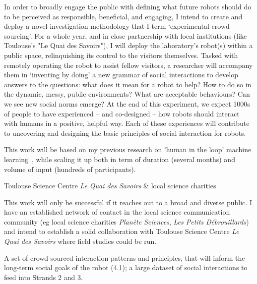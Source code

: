 In order to broadly engage the public with defining what future robots should do
to be perceived as responsible, beneficial, and engaging, I intend to create and
deploy a novel investigation methodology that I term `experimental
crowd-sourcing'. 
For a whole year, and in close partnership with local institutions
(like Toulouse's "Le Quai des Savoirs"), I will deploy the laboratory's robot(s)
within a public space, relinquishing its
control to the visitors themselves. Tasked with remotely operating the robot to
assist fellow visitors, a researcher will accompany them in `inventing by doing' a new
grammar of social interactions to develop answers to the questions: what does it
mean for a robot to help? How to do so in the dynamic, messy, public
environments? What are acceptable behaviours? Can we see new social norms
emerge? At the end of this experiment, we expect 1000s of people to have
experienced -- and co-designed -- how robots should interact with humans in a
positive, helpful way. Each of these experiences will contribute to uncovering
and designing the basic principles of social interaction for robots.

This work will be based on my previous research on 'human in the loop' machine
learning~\autocite{senft2019teaching,winkle2020insitu}, while scaling it up both
in term of duration (several months) and volume of input (hundreds of
participants).

\begin{collaboration}{Toulouse Science Centre \emph{Le Quai des Savoirs}
    \newline \& local science charities}

    This work will only be successful if it reaches out to a broad and diverse
    public. I have an established network of contact in the local science
    communication community (eg local science charities \emph{Planète Sciences},
    \emph{Les Petits Débrouillards}) and intend to establish a solid
    collaboration with Toulouse Science Centre \emph{Le Quai des Savoirs} where
    field studies could be run.
    
\end{collaboration}

\begin{outcome}{5.1}
A set of crowd-sourced interaction
    patterns and principles, that will inform the long-term social goals of the
    robot (4.1); a large dataset of social interactions to feed into Strands 2
    and 3.
\end{outcome}


